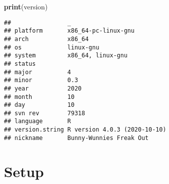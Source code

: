 \documentclass[]{book}
\newenvironment{Shaded}{\begin{snugshade}}{\end{snugshade}}
\newcommand{\KeywordTok}[1]{\textcolor[rgb]{0.13,0.29,0.53}{\textbf{#1}}}
\newcommand{\NormalTok}[1]{#1}
\begin{document}
\begin{Shaded}
\begin{Highlighting}[]
\KeywordTok{print}\NormalTok{(version)}
\end{Highlighting}
\end{Shaded}

\begin{verbatim}
##                _                           
## platform       x86_64-pc-linux-gnu         
## arch           x86_64                      
## os             linux-gnu                   
## system         x86_64, linux-gnu           
## status                                     
## major          4                           
## minor          0.3                         
## year           2020                        
## month          10                          
## day            10                          
## svn rev        79318                       
## language       R                           
## version.string R version 4.0.3 (2020-10-10)
## nickname       Bunny-Wunnies Freak Out
\end{verbatim}

\hypertarget{setup-1}{%
\section{Setup}\label{setup-1}}
\end{document}
